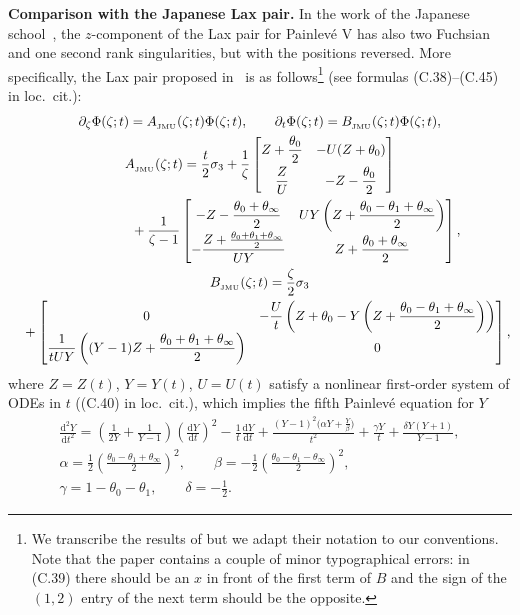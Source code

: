 \documentclass[pdftex]{sigma}
\numberwithin{equation}{section}
\theoremstyle{definition}
\def\le{\left}
\def\ri{\right}
\def \d{{\mathrm d}}
\def\nn{\nonumber}
\def\s{\sigma}
\def\pa{\partial}
\begin{document}
{\bf Comparison with the Japanese Lax pair.}
In the work of the Japanese school~\cite{JMU2}, the $z$-component of the Lax pair for Painlev\'e V has also two Fuchsian and one second rank singularities, but with the positions reversed.
More specifically, the Lax pair proposed in~\cite{JMU2} is as follows\footnote{We transcribe the results of \cite{JMU2} but we adapt their notation to our conventions. Note that the paper contains a couple of minor typographical errors: in (C.39) there should be an $x$ in front of the first term of $B$ and the sign of the $(1,2)$ entry of the next term should be the opposite.} (see formulas (C.38)--(C.45) in loc.\ cit.):
 \begin{gather}%
\pa_\zeta \Phi(\zeta;t) = A_{_{\rm JMU}}(\zeta;t) \Phi(\zeta;t),\qquad
\pa_t \Phi(\zeta;t) = B_{_{\rm JMU}}(\zeta;t) \Phi(\zeta;t),
\nn
\\
 A_{_{\rm JMU}}(\zeta;t) = \frac t 2 \s_3 + \frac 1 \zeta \begin{bmatrix}
 \displaystyle Z + \frac {\theta_0}2 & -U(Z+\theta_0)\vspace{1mm}\\
 \displaystyle \frac Z U & \displaystyle -Z - \frac {\theta_0}2
 \end{bmatrix}\nn\\
 \phantom{ A_{_{\rm JMU}}(\zeta;t) = }{}
 +\frac 1{\zeta-1}\begin{bmatrix}
 \displaystyle-Z-\frac {\theta_0 + \theta_\infty}2 &
\displaystyle UY\left(Z+ \frac {\theta_0-\theta_1+ \theta_\infty}2\right) \\
\displaystyle-\frac{Z+\frac {\theta_0 + \theta_1 + \theta_\infty}2}{UY} &
\displaystyle Z+\frac {\theta_0 + \theta_\infty}2
 \end{bmatrix},
\nn
\\
 B_{_{\rm JMU}}(\zeta;t) = \frac \zeta 2 \s_3 \label{LaxJMU}\\
 \quad{}+ \begin{bmatrix}
 0
 &
 \displaystyle -\frac {U}t\left( Z +\theta_0 - Y\left(Z + \frac {\theta_0 - \theta_1 + \theta_\infty}2\right)\right)\\
 \displaystyle \frac 1{t U Y} \left(( Y -1) Z + \frac {\theta_0 + \theta_1 +\theta_\infty}2\right)
 & 0
 \end{bmatrix},\nn
 \end{gather}
 where $Z = Z(t)$, $ Y = Y(t)$, $ U=U(t)$ satisfy a nonlinear first-order system of ODEs in $t$ ((C.40) in loc.\ cit.), which implies the fifth Painlev\'e equation for $Y$
 \begin{gather}
\frac {\d^2 Y}{\d t^2 } = \le(\frac 1{2Y} + \frac 1{Y-1} \ri) \le(\frac {\d Y}{\d t}\ri)^2 - \frac 1 t \frac {\d Y}{\d t} + \frac {(Y-1)^2\bigl(\alpha Y+\frac Y \beta\bigr)}{t^2} + \frac {\gamma Y}t + \frac {\delta Y(Y+1)}{Y-1},\nn
\\
\alpha = \frac 1 2 \le(\frac {\theta_0 - \theta_1 + \theta_\infty }2\ri)^2,\qquad
\beta = -\frac 1 2 \le(\frac {\theta_0 - \theta_1 - \theta_\infty }2\ri)^2,\nn\\
\gamma = 1 -\theta_0 - \theta_1,\qquad \delta = -\frac 1 2. \label{PV}
 \end{gather}
\end{document}
